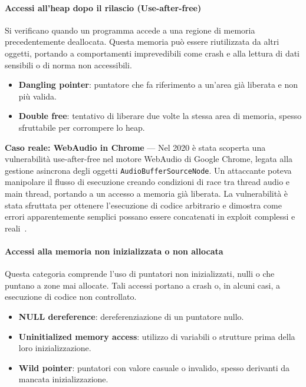 \paragraph{Accessi all'heap dopo il rilascio (Use-after-free)}
\label{sec:uaf}

Si verificano quando un programma accede a una regione di memoria
precedentemente deallocata. Questa memoria può essere riutilizzata da altri oggetti,
portando a comportamenti imprevedibili come crash e alla lettura di dati
sensibili o di norma non accessibili.

\begin{itemize}
  \item \textbf{Dangling pointer}: puntatore che fa riferimento a un'area già liberata
    e non più valida.

  \item \textbf{Double free}: tentativo di liberare due volte la stessa area di memoria,
    spesso sfruttabile per corrompere lo heap.
\end{itemize}

\textbf{Caso reale: WebAudio in Chrome} — Nel 2020 è stata scoperta una
vulnerabilità use-after-free nel motore WebAudio di Google Chrome, legata alla gestione
asincrona degli oggetti \texttt{AudioBufferSourceNode}. Un attaccante poteva manipolare
il flusso di esecuzione creando condizioni di race tra thread audio e main thread,
portando a un accesso a memoria già liberata. La vulnerabilità è stata sfruttata
per ottenere l'esecuzione di codice arbitrario e dimostra come errori apparentemente
semplici possano essere concatenati in exploit complessi e reali~\cite{webaudio_uaf}.

\paragraph{Accessi alla memoria non inizializzata o non allocata}
\label{sec:invalid_access}

Questa categoria comprende l'uso di puntatori non inizializzati, nulli o che
puntano a zone mai allocate. Tali accessi portano a crash o, in alcuni casi, a esecuzione
di codice non controllato.

\begin{itemize}
  \item \textbf{NULL dereference}: dereferenziazione di un puntatore nullo.

  \item \textbf{Uninitialized memory access}: utilizzo di variabili o strutture prima
    della loro inizializzazione.

  \item \textbf{Wild pointer}: puntatori con valore casuale o invalido, spesso
    derivanti da mancata inizializzazione.
\end{itemize}

